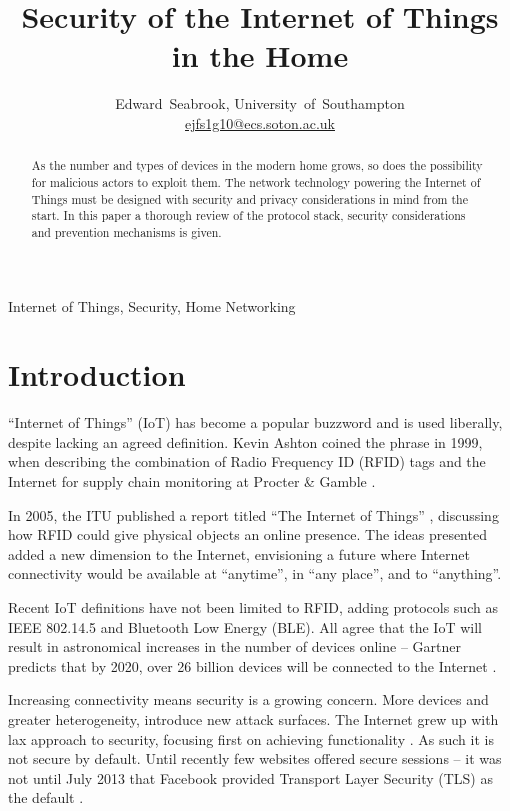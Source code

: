 \documentclass[10pt,journal,compsoc]{IEEEtran}
\begin{document}
\title{Security of the Internet of Things in the Home}
\author{Edward~Seabrook, University~of~Southampton \\ \href{mailto:ejfs1g10@ecs.soton.ac.uk}{ejfs1g10@ecs.soton.ac.uk}}

\maketitle

\begin{abstract}
As the number and types of devices in the modern home grows, so does the
possibility for malicious actors to exploit them. The network technology
powering the Internet of Things must be designed with security and privacy
considerations in mind from the start. In this paper a thorough review of the
protocol stack, security considerations and prevention mechanisms is given. 
\end{abstract}
\begin{IEEEkeywords}
Internet of Things, Security, Home Networking
\end{IEEEkeywords}

\IEEEpeerreviewmaketitle

\section{Introduction}
 ``Internet of Things'' (IoT) has become a popular
buzzword and is used liberally, despite lacking an agreed definition. Kevin
Ashton coined the phrase in 1999, when describing the combination of Radio
Frequency ID (RFID) tags and the Internet for supply chain monitoring at
Procter \& Gamble \cite{Ashton2009}. 

In 2005, the ITU published a report titled ``The Internet of Things''
\cite{ITU_IoT}, discussing how RFID could give physical objects an online
presence. The ideas presented added a new dimension to the Internet,
envisioning a future where Internet connectivity would be available at
``anytime'', in ``any place'', and to ``anything''.

Recent IoT definitions have not been limited to RFID, adding protocols such
as IEEE 802.14.5 and Bluetooth Low Energy (BLE). All agree that the IoT
will result in astronomical increases in the number of devices online --
Gartner predicts that by 2020, over 26 billion devices will be connected to the
Internet \cite{Gartner2014}. 

Increasing connectivity means security is a growing concern. More devices and
greater heterogeneity, introduce new attack surfaces. The Internet grew up with
lax approach to security, focusing first on achieving functionality
\cite{Bhimani1996}. As such it is not secure by default. Until recently few
websites offered secure sessions -- it was not until July 2013 that Facebook
provided Transport Layer Security (TLS) as the default \cite{Facebook2013}. 
\end{document}
